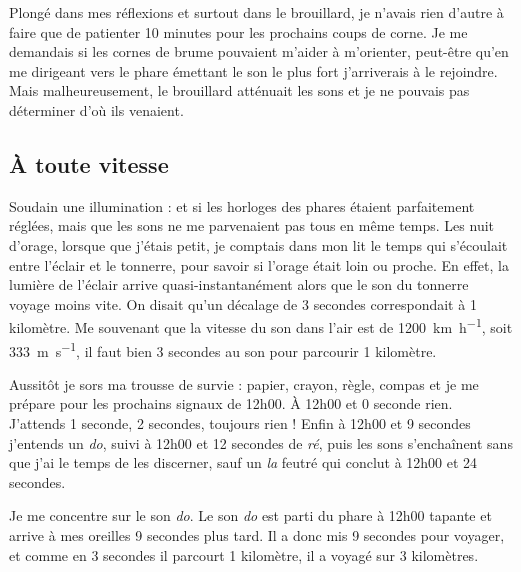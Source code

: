 \documentclass[class=report,crop=false]{standalone}
\begin{document}
Plongé dans mes réflexions et surtout dans le brouillard, je n'avais rien d'autre à faire
que de patienter 10 minutes pour les prochains coups de corne. Je me demandais si les 
cornes de brume pouvaient m'aider à m'orienter, peut-être qu'en me dirigeant vers le phare 
émettant le son le plus fort j'arriverais  à le rejoindre. Mais malheureusement, le brouillard
atténuait les sons et je ne pouvais pas déterminer d'où ils venaient.

\newpage
\thispagestyle{empty}
\def\myscale{0.9}
\vfill
\begin{center}
{
}   
\end{center}




\newpage

\subsection{À toute vitesse}

Soudain une illumination : et si les horloges des phares étaient parfaitement réglées, mais que 
les sons ne me parvenaient pas tous en même temps. Les nuit d'orage, 
lorsque que j'étais petit, je comptais dans mon lit le temps qui s'écoulait entre
l'éclair et le tonnerre, pour savoir si l'orage était loin ou proche.
En effet, la lumière de l'éclair arrive quasi-instantanément alors que le son du tonnerre 
voyage moins vite. On disait qu'un décalage de 3 secondes correspondait à 1 kilomètre.
Me souvenant que la vitesse du son dans l'air est de \SI{1200}{\kilo \meter \per \hour},
soit \SI{333}{\meter\per\second}, il faut bien 3 secondes au son pour parcourir 
1 kilomètre.

Aussitôt je sors ma trousse de survie : papier, crayon, règle, compas
et je me prépare pour les prochains signaux de 12h00.
\`A 12h00 et 0 seconde rien. J'attends 1 seconde, 2 secondes, toujours rien !
Enfin à 12h00 et 9 secondes j'entends un \emph{do}, 
suivi à 12h00 et 12 secondes de \emph{ré}, puis les sons s’enchaînent sans que j'ai le temps
de les discerner, sauf un \emph{la} feutré qui conclut à 12h00 et 24 secondes.

Je me concentre sur le son \emph{do}. Le son \emph{do} est parti du phare à 12h00 tapante
et arrive à mes oreilles 9 secondes plus tard. Il a donc mis 9 secondes pour voyager,
et comme en 3 secondes il parcourt 1 kilomètre, il a voyagé sur 3 kilomètres.
\end{document}
